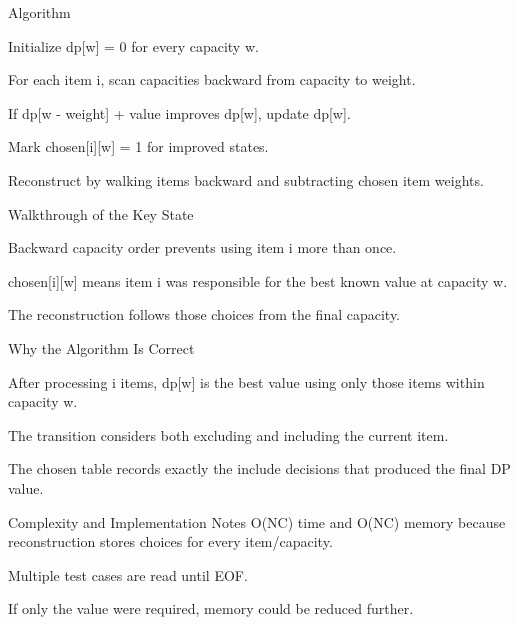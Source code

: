 \documentclass[aspectratio=169,11pt]{beamer}
\begin{document}
\begin{frame}{Algorithm}
\begin{tightitemize}
  \item Initialize dp[w] = 0 for every capacity w.
  \item For each item i, scan capacities backward from capacity to weight.
  \item If dp[w - weight] + value improves dp[w], update dp[w].
  \item Mark chosen[i][w] = 1 for improved states.
  \item Reconstruct by walking items backward and subtracting chosen item weights.
\end{tightitemize}
\end{frame}

\begin{frame}{Walkthrough of the Key State}
\begin{tightitemize}
  \item Backward capacity order prevents using item i more than once.
  \item chosen[i][w] means item i was responsible for the best known value at capacity w.
  \item The reconstruction follows those choices from the final capacity.
\end{tightitemize}
\end{frame}

\begin{frame}{Why the Algorithm Is Correct}
\begin{tightitemize}
  \item After processing i items, dp[w] is the best value using only those items within capacity w.
  \item The transition considers both excluding and including the current item.
  \item The chosen table records exactly the include decisions that produced the final DP value.
\end{tightitemize}
\end{frame}

\begin{frame}{Complexity and Implementation Notes}
\small
{} O(NC) time and O(NC) memory because reconstruction stores choices for every item/capacity.

\vspace{0.3cm}
\begin{tightitemize}
  \item Multiple test cases are read until EOF.
  \item If only the value were required, memory could be reduced further.
\end{tightitemize}
\end{frame}
\end{document}
